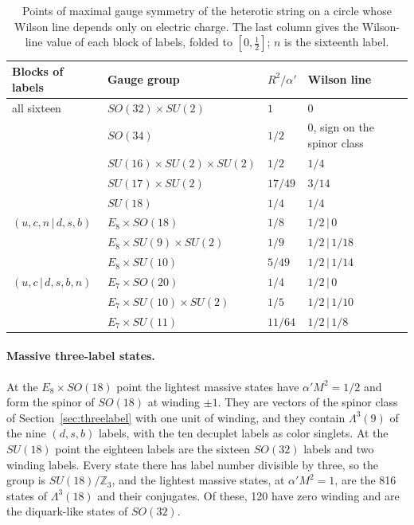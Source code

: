 \begin{table}[ht]
\centering
\caption{Points of maximal gauge symmetry of the heterotic string on a
circle whose Wilson line depends only on electric charge. The last
column gives the Wilson-line value of each block of labels, folded to
$[0,\tfrac12]$; $n$ is the sixteenth label.}
\label{tab:ninedim}
\begin{tabular}{@{}llll@{}}
\toprule
Blocks of labels & Gauge group & $R^2/\alpha'$ & Wilson line \\
\midrule
all sixteen & $SO(32)\times SU(2)$ & $1$ & $0$ \\
 & $SO(34)$ & $1/2$ & $0$, sign on the spinor class \\
 & $SU(16)\times SU(2)\times SU(2)$ & $1/2$ & $1/4$ \\
 & $SU(17)\times SU(2)$ & $17/49$ & $3/14$ \\
 & $SU(18)$ & $1/4$ & $1/4$ \\
$(u,c,n\,|\,d,s,b)$ & $E_8\times SO(18)$ & $1/8$ & $1/2\,|\,0$ \\
 & $E_8\times SU(9)\times SU(2)$ & $1/9$ & $1/2\,|\,1/18$ \\
 & $E_8\times SU(10)$ & $5/49$ & $1/2\,|\,1/14$ \\
$(u,c\,|\,d,s,b,n)$ & $E_7\times SO(20)$ & $1/4$ & $1/2\,|\,0$ \\
 & $E_7\times SU(10)\times SU(2)$ & $1/5$ & $1/2\,|\,1/10$ \\
 & $E_7\times SU(11)$ & $11/64$ & $1/2\,|\,1/8$ \\
\bottomrule
\end{tabular}
\end{table}

\paragraph{Massive three-label states.}
At the $E_8\times SO(18)$ point the lightest massive states have
$\alpha'M^2=1/2$ and form the spinor of $SO(18)$ at winding $\pm1$.
They are vectors of the spinor class of Section~\ref{sec:threelabel}
with one unit of winding, and they contain $\Lambda^3(9)$ of the nine
$(d,s,b)$ labels, with the ten decuplet labels as color singlets. At the
$SU(18)$ point the eighteen labels are the sixteen $SO(32)$ labels and
two winding labels. Every state there has label number divisible by
three, so the group is $SU(18)/\mathbb Z_3$, and the lightest massive
states, at $\alpha'M^2=1$, are the 816 states of $\Lambda^3(18)$ and
their conjugates. Of these, 120 have zero winding and are the
diquark-like states of $SO(32)$.

